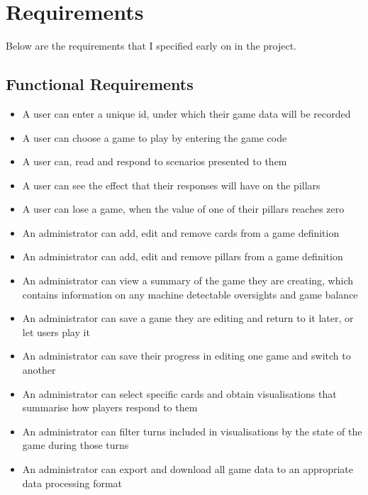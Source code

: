 \chapter{Requirements}


Below are the requirements that I specified early on in the project.

\section{Functional Requirements}

\begin{itemize}
        \item A user can enter a unique id, under which their game data will be recorded
        \item A user can choose a game to play by entering the game code
        \item A user can, read and respond to scenarios presented to them
        \item A user can see the effect that their responses will have on the pillars
        \item A user can lose a game, when the value of one of their pillars reaches zero
        \item An administrator can add, edit and remove cards from a game definition
        \item An administrator can add, edit and remove pillars from a game definition
        \item An administrator can view a summary of the game they are creating, which contains information on any machine detectable oversights and game balance 
        \item An administrator can save a game they are editing and return to it later, or let users play it
        \item An administrator can save their progress in editing one game and switch to another
        \item An administrator can select specific cards and obtain visualisations that summarise how players respond to them
        \item An administrator can filter turns included in visualisations by the state of the game during those turns
        \item An administrator can export and download all game data to an appropriate data processing format
\end{itemize}

